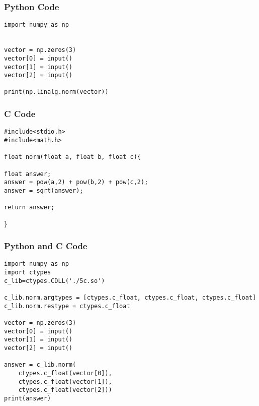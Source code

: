 \documentclass{beamer}
\begin{document}
\begin{frame}[fragile]
    \frametitle{Python Code}
    \begin{lstlisting}
import numpy as np


vector = np.zeros(3)
vector[0] = input()
vector[1] = input()
vector[2] = input()

print(np.linalg.norm(vector))

\end{lstlisting}

\end{frame}


\begin{frame}[fragile]
\frametitle{C Code}
\begin{lstlisting}
#include<stdio.h>
#include<math.h>

float norm(float a, float b, float c){

float answer;
answer = pow(a,2) + pow(b,2) + pow(c,2);
answer = sqrt(answer);

return answer;

}
\end{lstlisting}

\end{frame}


\begin{frame}[fragile]
\frametitle{Python and C Code}
\begin{lstlisting}
import numpy as np
import ctypes
c_lib=ctypes.CDLL('./5c.so')

c_lib.norm.argtypes = [ctypes.c_float, ctypes.c_float, ctypes.c_float]
c_lib.norm.restype = ctypes.c_float

vector = np.zeros(3)
vector[0] = input()
vector[1] = input()
vector[2] = input()

answer = c_lib.norm(
    ctypes.c_float(vector[0]),
    ctypes.c_float(vector[1]), 
    ctypes.c_float(vector[2]))
print(answer)
\end{lstlisting}

\end{frame}
\end{document}

